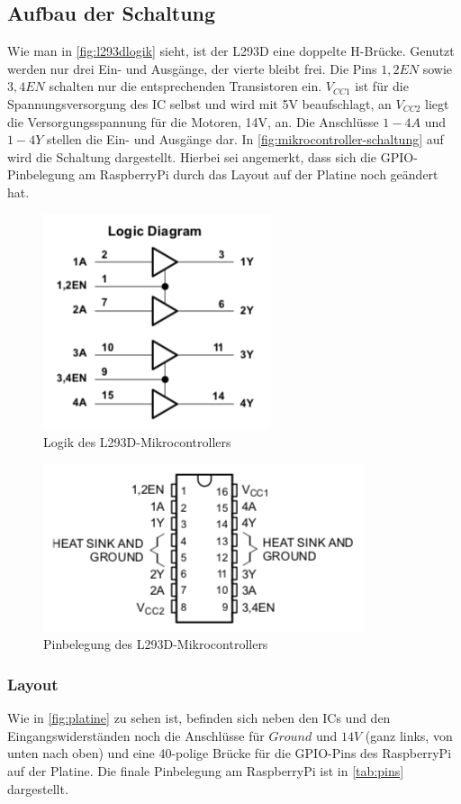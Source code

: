 \documentclass[12pt,a4paper,bibliography=totocnumbered,listof=totocnumbered]{scrartcl}
\begin{document}
\subsection{Aufbau der Schaltung}
Wie man in \autoref{fig:l293dlogik} sieht, ist der L293D eine doppelte H-Brücke. Genutzt werden nur drei Ein- und Ausgänge, der vierte bleibt frei. Die Pins $1,2EN$ sowie $3,4EN$ schalten nur die entsprechenden Transistoren ein. $V_{CC1}$ ist für die Spannungsversorgung des IC selbst und wird mit 5V beaufschlagt, an $V_{CC2}$ liegt die Versorgungsspannung für die Motoren, 14V, an. Die Anschlüsse $1-4A$ und $1-4Y$ stellen die Ein- und Ausgänge dar. In \autoref{fig:mikrocontroller-schaltung} auf  wird die Schaltung dargestellt. Hierbei sei angemerkt, dass sich die GPIO-Pinbelegung am RaspberryPi durch das Layout auf der Platine noch geändert hat.
\begin{figure}[th]
	\centering
	\includegraphics[width=0.4\linewidth]{l293d_logik}
	\caption{Logik des L293D-Mikrocontrollers \cite{l293d}}
	\label{fig:l293dlogik}
\end{figure}

\begin{figure}[th]
	\centering
	\includegraphics[width=0.6\linewidth]{l293d_pins}
	\caption{Pinbelegung des L293D-Mikrocontrollers \cite{l293d}}
	\label{fig:l293dpins}
\end{figure}

\subsubsection{Layout}
Wie in \autoref{fig:platine} zu sehen ist, befinden sich neben den ICs und den Eingangswiderständen noch die Anschlüsse für $Ground$ und $14V$ (ganz links, von unten nach oben) und eine 40-polige Brücke für die GPIO-Pins des RaspberryPi auf der Platine. Die finale Pinbelegung am RaspberryPi ist in \autoref{tab:pins} dargestellt.
\end{document}
